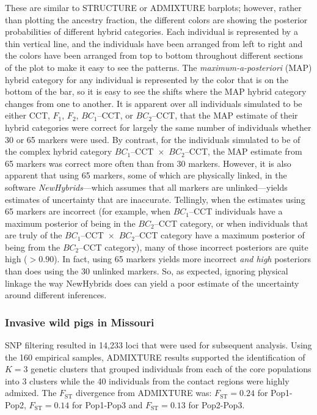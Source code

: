 {\begin{figure}
{}
\caption[\nhbpcap]{\nhbpcap}
\label{fig:newhyb-sims-barplot}
\end{figure}
These are similar to STRUCTURE or ADMIXTURE barplots;
however, rather than plotting the ancestry fraction, the different colors are showing the
posterior probabilities of different hybrid categories.  Each individual is represented by a thin
vertical line, and the individuals have been arranged from left to right and the colors have been
arranged from top to bottom throughout different sections of the plot to make it easy to see
the patterns.  The {\em maximum-a-posteriori} (MAP) hybrid category for any individual is represented
by the color that is on the bottom of the bar, so it is easy to see the shifts where the MAP hybrid
category changes from one to another.  It is apparent over all individuals simulated to be
either CCT, $F_1$, $F_2$, $BC_1$--CCT, or $BC_2$--CCT, that the MAP estimate of their
hybrid categories were correct for largely the same number of individuals whether 30 or 65 markers
were used. By contrast, for the individuals simulated to be of the complex hybrid category
$BC_1$--CCT~$\times$~$BC_2$--CCT, the MAP estimate from 65 markers was correct more often 
than from 
30 markers.  However, it is also apparent that using 65 markers, some of which are physically
linked, in the software {\em NewHybrids}---which assumes that all markers are unlinked---yields 
estimates of uncertainty that are inaccurate.  Tellingly, when the estimates using 65 markers are 
incorrect (for example, when $BC_1$--CCT individuals have a maximum posterior of being in the 
$BC_2$--CCT category,
or when individuals that are truly of the $BC_1$--CCT~$\times$~$BC_2$--CCT category have a
maximum posterior of being from the $BC_2$--CCT category), many of those incorrect posteriors
are quite high ($>0.90$).  In fact, using 65 markers yields more incorrect {\em and high} posteriors 
than does using the 30 unlinked markers. So, as expected, ignoring physical linkage the way
{\sc NewHybrids} does can yield a poor estimate of the uncertainty around different inferences.

\subsubsection*{Invasive wild pigs in Missouri}

SNP filtering resulted in 14,233 loci that were used for subsequent analysis.
Using the 160 empirical samples, ADMIXTURE results supported the identification of
$K=3$ genetic clusters that grouped individuals from each of the core populations into 3 clusters
while the 40 individuals from the contact regions were highly admixed. The
$F_\mathrm{ST}$ divergence from ADMIXTURE was:
$F_\mathrm{ST} = 0.24$ for Pop1-Pop2,
$F_\mathrm{ST} = 0.14$ for Pop1-Pop3 and
$F_\mathrm{ST} = 0.13$ for Pop2-Pop3.

}
